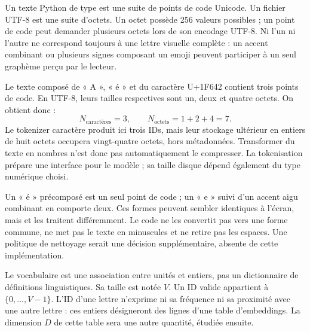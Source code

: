 
Un texte Python de type  est une suite de points de code Unicode.
Un fichier UTF-8 est une suite d'octets. Un octet possède 256 valeurs possibles ;
un point de code peut demander plusieurs octets lors de son encodage UTF-8.
Ni l'un ni l'autre ne correspond toujours à une lettre visuelle complète :
un accent combinant ou plusieurs signes composant un emoji peuvent participer
à un seul graphème perçu par le lecteur.

Le texte composé de « A », « é » et du caractère U+1F642 contient
trois points de code. En UTF-8, leurs tailles respectives sont un, deux
et quatre octets. On obtient donc :
\[
    N_{\text{caractères}}=3,\qquad N_{\mathrm{octets}}=1+2+4=7.
\]
Le tokenizer caractère produit ici trois IDs, mais leur stockage ultérieur
en entiers de huit octets occupera vingt-quatre octets, hors métadonnées.
Transformer du texte en nombres n'est donc pas automatiquement le compresser.
La tokenisation prépare une interface pour le modèle ; sa taille disque
dépend également du type numérique choisi.

Un « é » précomposé est un seul point de code ; un « e » suivi d'un accent
aigu combinant en comporte deux. Ces formes peuvent sembler identiques à
l'écran, mais  et  les traitent différemment.
Le code ne les convertit pas vers une forme commune, ne met pas le texte en
minuscules et ne retire pas les espaces. Une politique de nettoyage serait
une décision supplémentaire, absente de cette implémentation.

Le vocabulaire est une association entre unités et entiers, pas un dictionnaire
de définitions linguistiques. Sa taille est notée \(V\).
Un ID valide appartient à \(\{0,\ldots,V-1\}\).
L'ID d'une lettre n'exprime ni sa fréquence ni sa proximité avec une autre
lettre : ces entiers désigneront des lignes d'une table d'embeddings.
La dimension \(D\) de cette table sera une autre quantité, étudiée ensuite.

